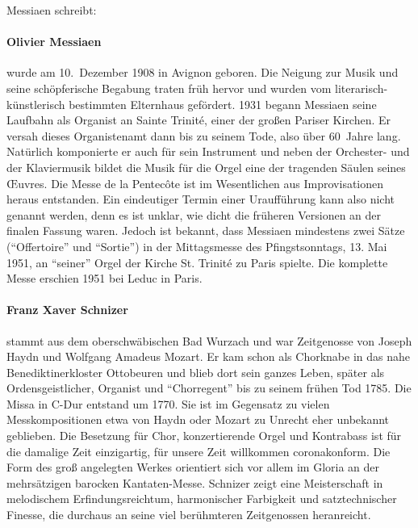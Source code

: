 \documentclass[a5paper,twoside,fontsize=11pt]{scrartcl}
\begin{document}
\medskip

\noindent Messiaen schreibt:

\newpage

\paragraph{Olivier Messiaen} wurde am 10. Dezember 1908 in Avignon geboren. 
Die Neigung zur Musik und seine schöpferische Begabung traten früh hervor und wurden vom literarisch-künstlerisch bestimmten Elternhaus gefördert.
1931 begann Messiaen seine Laufbahn als Organist an Sainte Trinité, einer der großen Pariser Kirchen.
Er versah dieses Organistenamt dann bis zu seinem Tode, also über 60 Jahre lang.
Natürlich komponierte er auch für sein Instrument und neben der Orchester- und der Klaviermusik bildet die Musik für die Orgel eine der tragenden Säulen seines Œuvres.
Die Messe de la Pentecôte ist im Wesentlichen aus Improvisationen heraus entstanden.
Ein eindeutiger Termin einer Uraufführung kann also nicht genannt werden, denn es ist unklar, wie dicht die früheren Versionen an der finalen Fassung waren.
Jedoch ist bekannt, dass Messiaen mindestens zwei Sätze (\enquote{Offertoire} und \enquote{Sortie}) in der Mittagsmesse des Pfingstsonntags, 13. Mai 1951, an \enquote{seiner} Orgel der Kirche St. Trinité zu Paris spielte.
Die komplette Messe erschien 1951 bei Leduc in Paris.


\paragraph{Franz Xaver Schnizer} stammt aus dem oberschwäbischen Bad Wurzach und war Zeitgenosse von Joseph Haydn und Wolfgang Amadeus Mozart. Er kam schon als Chorknabe in das nahe Benediktinerkloster Ottobeuren und blieb dort sein ganzes Leben, später als Ordensgeistlicher, Organist und \enquote{Chorregent} bis zu seinem frühen Tod 1785.
Die Missa in C-Dur entstand um 1770. Sie ist im Gegensatz zu vielen Messkompositionen etwa von Haydn oder Mozart zu Unrecht eher unbekannt geblieben. 
Die Besetzung für Chor, konzertierende Orgel und Kontrabass ist für die damalige Zeit einzigartig, für unsere Zeit willkommen coronakonform. 
Die Form des groß angelegten Werkes orientiert sich vor allem im Gloria an der mehrsätzigen barocken Kantaten-Messe. Schnizer zeigt eine Meisterschaft in melodischem Erfindungsreichtum, harmonischer Farbigkeit und satztechnischer Finesse, die durchaus an seine viel berühmteren Zeitgenossen heranreicht.
\end{document}
